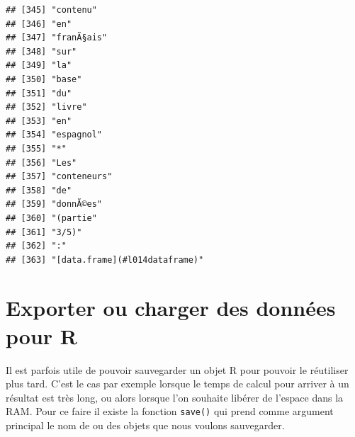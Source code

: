 \documentclass[]{book}
\begin{document}
\begin{verbatim}
## [345] "contenu"                                                                                
## [346] "en"                                                                                     
## [347] "franÃ§ais"                                                                              
## [348] "sur"                                                                                    
## [349] "la"                                                                                     
## [350] "base"                                                                                   
## [351] "du"                                                                                     
## [352] "livre"                                                                                  
## [353] "en"                                                                                     
## [354] "espagnol"                                                                               
## [355] "*"                                                                                      
## [356] "Les"                                                                                    
## [357] "conteneurs"                                                                             
## [358] "de"                                                                                     
## [359] "donnÃ©es"                                                                               
## [360] "(partie"                                                                                
## [361] "3/5)"                                                                                   
## [362] ":"                                                                                      
## [363] "[data.frame](#l014dataframe)"
\end{verbatim}

\hypertarget{l016save}{%
\section{Exporter ou charger des données pour R}\label{l016save}}

Il est parfois utile de pouvoir sauvegarder un objet R pour pouvoir le réutiliser plus tard. C'est le cas par exemple lorsque le temps de calcul pour arriver à un résultat est très long, ou alors lorsque l'on souhaite libérer de l'espace dans la RAM. Pour ce faire il existe la fonction \texttt{save()} qui prend comme argument principal le nom de ou des objets que nous voulons sauvegarder.
\end{document}
